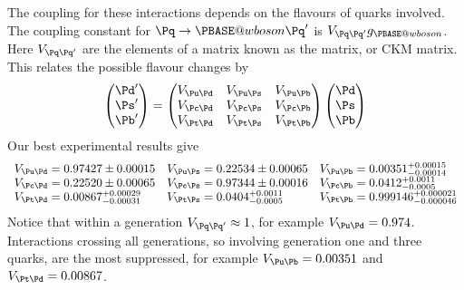 \documentclass[fleqn]{NotesClass}
\makeatletter
\newcommand{\Pwboson}{\ensuremath{\PBASE@wboson}}
\newcommand{\PW}{\Pwboson}
\makeatother
\begin{document}
    The coupling for these interactions depends on the flavours of quarks involved.
    The coupling constant for \(\Pq \to \PW\Pq'\) is \(V_{\Pq\Pq'}g_{\PW}\).
    Here \(V_{\Pq\Pq'}\) are the elements of a matrix known as the  matrix, or CKM matrix.
    This relates the possible flavour changes by
    \begin{equation}
        \begin{pmatrix}
            \Pd'\\ \Ps'\\ \Pb'
        \end{pmatrix}
        =
        \begin{pmatrix}
            V_{\Pu\Pd} & V_{\Pu\Ps} & V_{\Pu\Pb} \\
            V_{\Pc\Pd} & V_{\Pc\Ps} & V_{\Pc\Pb} \\
            V_{\Pt\Pd} & V_{\Pt\Ps} & V_{\Pt\Pb}
        \end{pmatrix}
        \begin{pmatrix}
            \Pd\\ \Ps\\ \Pb
        \end{pmatrix}
    \end{equation}
    Our best experimental results give
    \begin{equation*}
        \begin{array}{lll}
            V_{\Pu\Pd} = 0.97427 \pm 0.00015 & V_{\Pu\Ps} = 0.22534 \pm 0.00065 & V_{\Pu\Pb} = 0.00351 \substack{+0.00015\\-0.00014}\\
            V_{\Pc\Pd} = 0.22520 \pm 0.00065 & V_{\Pc\Ps} = 0.97344 \pm 0.00016 & V_{\Pc\Pb} = 0.0412 \substack{+0.0011\\-0.0005}\\
            V_{\Pt\Pd} = 0.00867 \substack{+0.00029\\-0.00031} & V_{\Pt\Ps} = 0.0404 \substack{+0.0011\\-0.0005} & V_{\Pt\Pb} = 0.999146 \substack{{}+0.000021\\{}-0.000046}
        \end{array}
    \end{equation*}
    Notice that within a generation \(V_{\Pq\Pq'} \approx 1\), for example \(V_{\Pu\Pd} = 0.974\).
    Interactions crossing all generations, so involving generation one and three quarks, are the most suppressed, for example \(V_{\Pu\Pb} = 0.00351\) and \(V_{\Pt\Pd} = 0.00867\).
    
\end{document}
